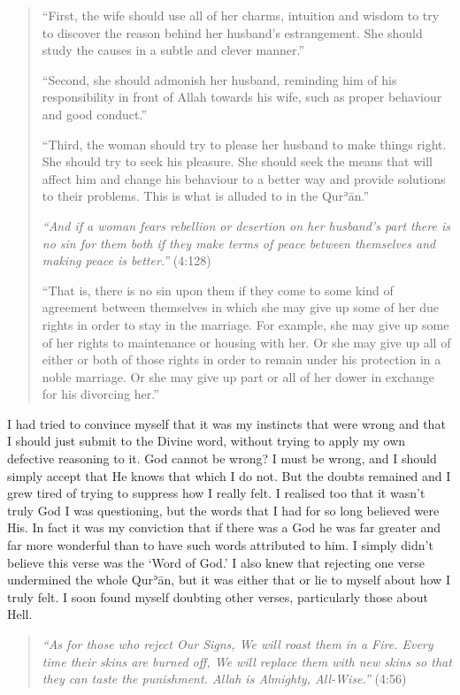 \documentclass[12pt]{memoir}
\def\´{ʾ} %
\def \Quran{Qur\-\´ān} %
\newcommand{\QRef}[1]{{\color{darkblue}#1}}
\begin{document}
\begin{quote}
“First, the wife should use all of her charms,
intuition and wisdom to try to discover the reason
behind her husband’s estrangement.
She should study the causes in a subtle and clever manner.”

“Second, she should admonish her husband,
reminding him of his responsibility in front of Allah towards his wife,
such as proper behaviour and good conduct.”

“Third, the woman should try to please her husband to make things right.
She should try to seek his pleasure.
She should seek the means that will affect him
and change his behaviour to a better way
and provide solutions to their problems.
This is what is alluded to in the \Quran.”

\emph{“And if a woman fears rebellion or desertion on her husband’s part
there is no sin for them both if they make terms of peace between themselves
and making peace is better.”} (\QRef{4:128})

“That is, there is no sin upon them if they come to some kind of agreement
between themselves in which she may give up some of her due rights
in order to stay in the marriage.
For example, she may give up some of her rights
to maintenance or housing with her.
Or she may give up all of either or both of those rights
in order to remain under his protection in a noble marriage.
Or she may give up part or all of her dower
in exchange for his divorcing her.”
\end{quote}

I had tried to convince myself that it was my instincts
that were wrong and that I should just submit to the Divine word,
without trying to apply my own defective reasoning to it.
God cannot be wrong?
I must be wrong, and I should simply accept
that He knows that which I do not.
But the doubts remained and I grew tired of trying
to suppress how I really felt.
I realised too that it wasn’t truly God I was questioning,
but the words that I had for so long believed were His.
In fact it was my conviction that if there was a God
he was far greater and far more wonderful
than to have such words attributed to him.
I simply didn’t believe this verse was the ‘Word of God.’
I also knew that rejecting one verse undermined the whole \Quran,
but it was either that or lie to myself about how I truly felt.
I soon found myself doubting other verses, particularly those about Hell.

\begin{quote}
\emph{%
“As for those who reject Our Signs, We will roast them in a Fire.
Every time their skins are burned off,
We will replace them with new skins so that they can taste the punishment.
Allah is Almighty, All-Wise.”} (\QRef{4:56})
\end{quote}
\end{document}
